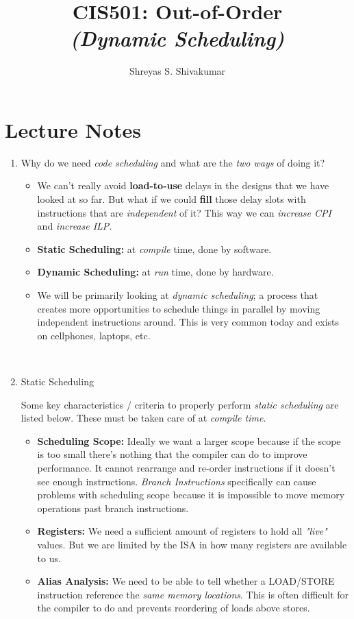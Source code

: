 \documentclass[12pt]{article}
\title{CIS501: Out-of-Order \\ \textit{(Dynamic Scheduling)}}
\author[1]{Shreyas S. Shivakumar}
\newenvironment{QandA}{\begin{enumerate}[label=\bfseries\arabic*.]\bfseries}
                      {\end{enumerate}}
\newenvironment{answered}{\par\quad\normalfont}{}
\begin{document}
\maketitle

\section{Lecture Notes}

\begin{QandA}
\item Why do we need \textit{code scheduling} and what are the \textit{two ways} of doing it?
\begin{answered}
\vspace{-0.85cm}
\begin{itemize}
    \item We can't really avoid \textbf{load-to-use} delays in the designs that we have looked at so far. But what if we could \textbf{fill} those delay slots with instructions that are \textit{independent} of it? This way we can \textit{increase CPI} and \textit{increase ILP}. 
    \item \textbf{Static Scheduling:} at \textit{compile} time, done by software. 
    \item \textbf{Dynamic Scheduling:} at \textit{run} time, done by hardware.
    \item We will be primarily looking at \textit{dynamic scheduling}; a process that creates more opportunities to schedule things in parallel by moving independent instructions around. This is very common today and exists on cellphones, laptops, etc.
\end{itemize}
\end{answered}

\ 

\item Static Scheduling
\begin{answered}
Some key characteristics / criteria to properly perform \textit{static scheduling} are listed below. These must be taken care of at \textit{compile time}. 
\begin{itemize}
    \item \textbf{Scheduling Scope:} Ideally we want a larger scope because if the scope is too small there's nothing that the compiler can do to improve performance. It cannot rearrange and re-order instructions if it doesn't see enough instructions. \textit{Branch Instructions} specifically can cause problems with scheduling scope because it is impossible to move memory operations past branch instructions. 
    \item \textbf{Registers:} We need a sufficient amount of registers to hold all \textit{"live"} values. But we are limited by the ISA in how many registers are available to us. 
    \item \textbf{Alias Analysis:} We need to be able to tell whether a LOAD/STORE instruction reference the \textit{same memory locations}. This is often difficult for the compiler to do and prevents reordering of loads above stores. 
\end{itemize}


\end{answered}
\end{QandA}
\end{document}
